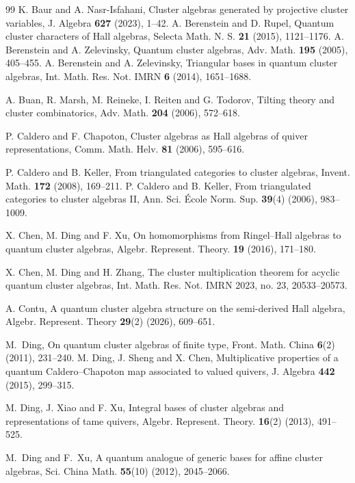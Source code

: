 \documentclass[reqno,12pt]{amsart}
\numberwithin{equation}{section}
\theoremstyle{plain} %
\theoremstyle{definition} %
\begin{document}
\begin{thebibliography}{99}
K. Baur and A. Nasr-Isfahani, {Cluster algebras generated by projective cluster variables}, J. Algebra {\bf 627} (2023), 1--42.
%
 A. Berenstein and D. Rupel, Quantum cluster characters of Hall algebras, Selecta Math. N. S. {\bf 21}
(2015), 1121--1176.
%
 A. Berenstein and A. Zelevinsky, Quantum cluster algebras,
Adv. Math. {\bf 195} (2005), 405--455.
 A. Berenstein and A. Zelevinsky, Triangular bases in quantum cluster algebras, Int. Math. Res. Not. IMRN {\bf 6} (2014), 1651--1688.
%

%
 A. Buan, R. Marsh, M. Reineke, I. Reiten
and G. Todorov, Tilting theory and cluster
combinatorics,  Adv. Math. {\bf 204} (2006), 572--618.


 P. Caldero and F. Chapoton, Cluster algebras as Hall algebras of
quiver representations,  Comm. Math. Helv. {\bf 81} (2006), 595--616.


 P. Caldero and B. Keller, From triangulated categories to cluster algebras, Invent. Math. {\bf 172} (2008), 169--211.
 P. Caldero and B. Keller, From triangulated categories to
cluster algebras II, Ann. Sci. {\'E}cole Norm. Sup. \textbf{39}(4)
(2006), 983--1009.

 X. Chen, M. Ding and  F. Xu, On homomorphisms from Ringel--Hall algebras to quantum cluster algebras, Algebr. Represent. Theory. {\bf 19} (2016), 171--180.

 X. Chen, M. Ding and H. Zhang, The cluster multiplication theorem for acyclic quantum cluster algebras, Int. Math. Res. Not. IMRN 2023, no. 23, 20533--20573.


 A. Contu, A quantum cluster algebra structure on the semi-derived Hall algebra,
Algebr. Represent. Theory {\bf 29}(2) (2026), 609--651.


 M.~Ding, On quantum cluster algebras of
finite type,  Front. Math. China \textbf{6}(2) (2011), 231--240.
 M. Ding, J. Sheng and X. Chen, Multiplicative properties of a quantum Caldero--Chapoton map associated to valued quivers, J. Algebra {\bf 442} (2015), 299--315.

 M. Ding, J. Xiao and F. Xu, {Integral bases of cluster algebras and representations of tame quivers,}
Algebr. Represent. Theory. \textbf{16}(2) (2013), 491--525.




 M.~Ding and F.~Xu, A quantum analogue of generic bases for
affine cluster algebras, Sci. China Math. \textbf{55}(10) (2012), 2045--2066.


\end{thebibliography}
\end{document}

